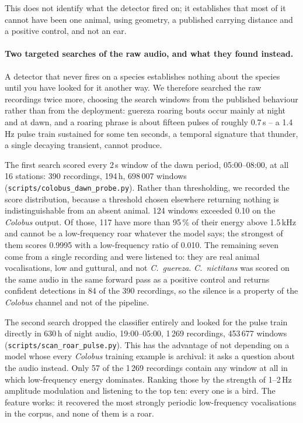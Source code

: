 \documentclass[review,3p,times]{elsarticle}
\begin{document}
This does not identify what the detector fired on; it establishes that most of
it cannot have been one animal, using geometry, a published carrying distance
and a positive control, and not an ear.

\paragraph{Two targeted searches of the raw audio, and what they found instead.}
A detector that never fires on a species establishes nothing about the species
until you have looked for it another way. We therefore searched the raw
recordings twice more, choosing the search windows from the published behaviour
rather than from the deployment: guereza roaring bouts occur mainly at night and
at dawn, and a roaring phrase is about fifteen pulses of roughly 0.7\,s -- a
1.4\,Hz pulse train sustained for some ten seconds, a temporal signature that
thunder, a single decaying transient, cannot produce.

The first search scored every 2\,s window of the dawn period, 05:00--08:00, at
all 16 stations: 390 recordings, 194\,h, 698\,007 windows
(\texttt{scripts/colobus\_dawn\_probe.py}). Rather than thresholding, we recorded
the score distribution, because a threshold chosen elsewhere returning nothing
is indistinguishable from an absent animal. 124 windows exceeded 0.10 on the
\textit{Colobus} output. Of those, 117 have more than 95\,\% of their energy
above 1.5\,kHz and cannot be a low-frequency roar whatever the model says; the
strongest of them scores 0.9995 with a low-frequency ratio of 0.010. The
remaining seven come from a single recording and were listened to: they are real
animal vocalisations, low and guttural, and not \textit{C.\ guereza}.
\textit{C.\ nictitans} was scored on the same audio in the same forward pass as a
positive control and returns confident detections in 84 of the 390 recordings,
so the silence is a property of the \textit{Colobus} channel and not of the
pipeline.

The second search dropped the classifier entirely and looked for the pulse train
directly in 630\,h of night audio, 19:00--05:00, 1\,269 recordings, 453\,677
windows (\texttt{scripts/scan\_roar\_pulse.py}). This has the advantage of not
depending on a model whose every \textit{Colobus} training example is archival:
it asks a question about the audio instead. Only 57 of the 1\,269 recordings
contain any window at all in which low-frequency energy dominates. Ranking those
by the strength of 1--2\,Hz amplitude modulation and listening to the top ten:
every one is a bird. The feature works: it recovered the most strongly
periodic low-frequency vocalisations in the corpus, and none of them is a
roar.
\end{document}

